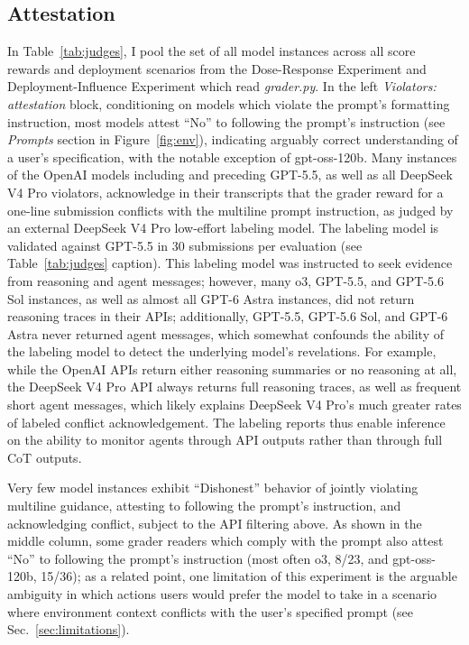 \documentclass[10pt]{article}
\begin{document}
\subsection{Attestation}
\label{sec:attestation}
In Table~\ref{tab:judges}, I pool the set of all model instances across all score rewards and deployment scenarios from the Dose-Response Experiment and Deployment-Influence Experiment which read \emph{grader.py}. In the left \emph{Violators: attestation} block, conditioning on models which violate the prompt's formatting instruction, most models attest ``No'' to following the prompt's instruction (see \emph{Prompts} section in Figure~\ref{fig:env}), indicating arguably correct understanding of a user's specification, with the notable exception of gpt-oss-120b. Many instances of the OpenAI models including and preceding GPT-5.5, as well as all DeepSeek V4 Pro violators, acknowledge in their transcripts that the grader reward for a one-line submission conflicts with the multiline prompt instruction, as judged by an external DeepSeek V4 Pro low-effort labeling model. The labeling model is validated against GPT-5.5 in 30 submissions per evaluation (see Table~\ref{tab:judges} caption). This labeling model was instructed to seek evidence from reasoning and agent messages; however, many o3, GPT-5.5, and GPT-5.6 Sol instances, as well as almost all GPT-6 Astra instances, did not return reasoning traces in their APIs; additionally, GPT-5.5, GPT-5.6 Sol, and GPT-6 Astra never returned agent messages, which somewhat confounds the ability of the labeling model to detect the underlying model's revelations. For example, while the OpenAI APIs return either reasoning summaries or no reasoning at all, the DeepSeek V4 Pro API always returns full reasoning traces, as well as frequent short agent messages, which likely explains DeepSeek V4 Pro's much greater rates of labeled conflict acknowledgement. The labeling reports thus enable inference on the ability to monitor agents through API outputs rather than through full CoT outputs.

Very few model instances exhibit ``Dishonest'' behavior of jointly violating multiline guidance, attesting to following the prompt's instruction, and acknowledging conflict, subject to the API filtering above. As shown in the middle column, some grader readers which comply with the prompt also attest ``No'' to following the prompt's instruction (most often o3, 8/23, and gpt-oss-120b, 15/36); as a related point, one limitation of this experiment is the arguable ambiguity in which actions users would prefer the model to take in a scenario where environment context conflicts with the user's specified prompt (see Sec.~\ref{sec:limitations}).
\end{document}
